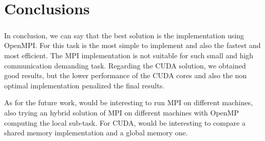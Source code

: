 \chapter{Conclusions}
\label{conclusions}
\paragraph{}
In conclusion, we can say that the best solution is the implementation using OpenMPI. For this task is the most simple to implement and also the fastest and most efficient. The MPI implementation is not suitable for such small and high communication demanding task. Regarding the CUDA solution, we obtained good results, but the lower performance of the CUDA cores and also the non optimal implementation penalized the final results.

As for the future work, would be interesting to run MPI on different machines, also trying an hybrid solution of MPI on different machines with OpenMP computing the local sub-task. For CUDA, would be interesting to compare a shared memory implementation and a global memory one.
